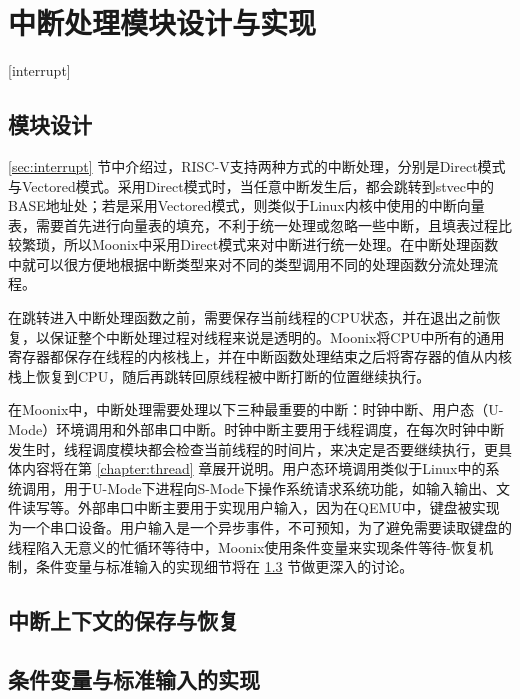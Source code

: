 
\chapter{中断处理模块设计与实现}[interrupt]
\label{chapter:interrupt}

\section{模块设计}

\ref{sec:interrupt} 节中介绍过，RISC-V支持两种方式的中断处理，分别是Direct模式与Vectored模式。采用Direct模式时，当任意中断发生后，都会跳转到stvec中的BASE地址处；若是采用Vectored模式，则类似于Linux内核中使用的中断向量表，需要首先进行向量表的填充，不利于统一处理或忽略一些中断，且填表过程比较繁琐，所以Moonix中采用Direct模式来对中断进行统一处理。在中断处理函数中就可以很方便地根据中断类型来对不同的类型调用不同的处理函数分流处理流程。

在跳转进入中断处理函数之前，需要保存当前线程的CPU状态，并在退出之前恢复，以保证整个中断处理过程对线程来说是透明的。Moonix将CPU中所有的通用寄存器都保存在线程的内核栈上，并在中断函数处理结束之后将寄存器的值从内核栈上恢复到CPU，随后再跳转回原线程被中断打断的位置继续执行。

在Moonix中，中断处理需要处理以下三种最重要的中断：时钟中断、用户态（U-Mode）环境调用和外部串口中断。时钟中断主要用于线程调度，在每次时钟中断发生时，线程调度模块都会检查当前线程的时间片，来决定是否要继续执行，更具体内容将在第 \ref{chapter:thread} 章展开说明。用户态环境调用类似于Linux中的系统调用，用于U-Mode下进程向S-Mode下操作系统请求系统功能，如输入输出、文件读写等。外部串口中断主要用于实现用户输入，因为在QEMU中，键盘被实现为一个串口设备。用户输入是一个异步事件，不可预知，为了避免需要读取键盘的线程陷入无意义的忙循环等待中，Moonix使用条件变量来实现条件等待-恢复机制，条件变量与标准输入的实现细节将在 \ref{sec:condition} 节做更深入的讨论。

\section{中断上下文的保存与恢复}

\section{条件变量与标准输入的实现}
\label{sec:condition}